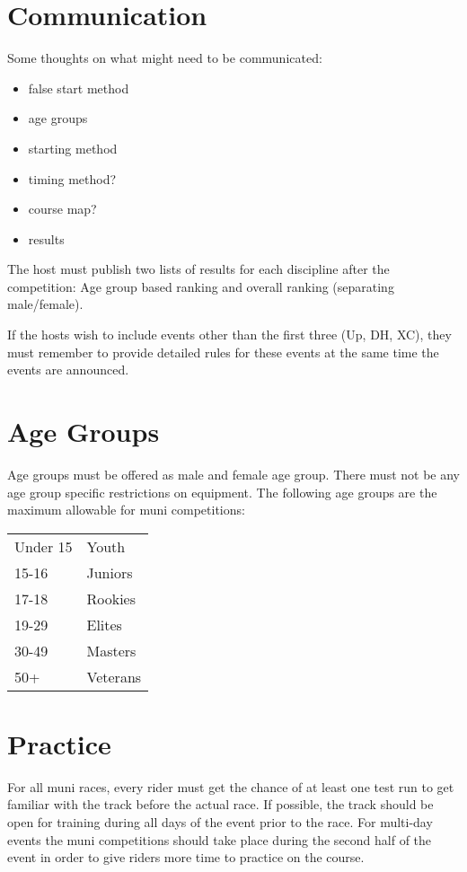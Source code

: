 \section{Communication}

\begin{framed}
Some thoughts on what might need to be communicated:
\begin{itemize}
\item false start method
\item age groups
\item starting method
\item timing method?
\item course map?
\item results
\end{itemize}
\end{framed}

The host must publish two lists of results for each discipline after the competition: Age group based ranking and overall ranking (separating
male/female).

If the hosts wish to include events other than the first three (Up, DH, XC), they must remember to provide detailed rules for these events at the same time the events are announced.

\section{Age Groups}
Age groups must be offered as male and female age group.
There must not be any age group specific restrictions on equipment.
The following age groups are the maximum allowable for muni competitions:

\begin{tabular}{ l l}
Under 15 & Youth \\
15-16 & Juniors \\
17-18 & Rookies \\
19-29 & Elites \\
30-49 & Masters \\
50+ & Veterans \\
\end{tabular}

\section{Practice}

For all muni races, every rider must get the chance of at least one test run to get familiar with the track before the actual race.
If possible, the track should be open for training during all days of the event prior to the race.
For multi-day events the muni competitions should take place during the second half of the event in order to give riders more time to practice on the course.

